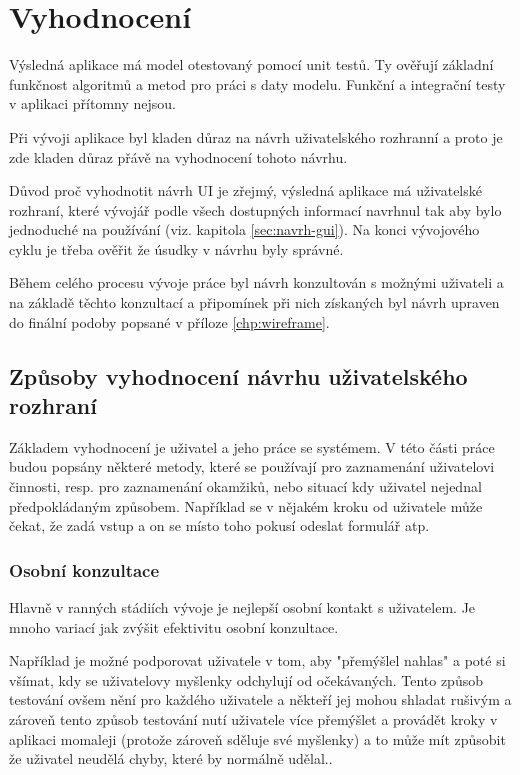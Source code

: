 \chapter{Vyhodnocení}
Výsledná aplikace má model otestovaný pomocí unit testů. Ty ověřují základní funkčnost algoritmů a metod pro práci s daty modelu. Funkční a integrační testy v aplikaci přítomny nejsou.

Při vývoji aplikace byl kladen důraz na návrh uživatelského rozhranní a proto je zde kladen důraz přávě na vyhodnocení tohoto návrhu.

Důvod proč vyhodnotit návrh UI je zřejmý, výsledná aplikace má uživatelské rozhraní, které vývojář podle všech dostupných informací navrhnul tak aby bylo jednoduché na používání (viz. kapitola \ref{sec:navrh-gui}). Na konci vývojového cyklu je třeba ověřit že úsudky v návrhu byly správné.  

Během celého procesu vývoje práce byl návrh konzultován s možnými uživateli a na základě těchto konzultací a připomínek při nich získaných byl návrh upraven do finální podoby popsané v příloze \ref{chp:wireframe}.

\section{Způsoby vyhodnocení návrhu uživatelského rozhraní}
Základem vyhodnocení je uživatel a jeho práce se systémem. V této části práce budou popsány některé metody, které se používají pro zaznamenání uživatelovi činnosti, resp. pro zaznamenání okamžiků, nebo situací kdy uživatel nejednal předpokládaným způsobem. Například se v nějakém kroku od uživatele může čekat, že zadá vstup a on se místo toho pokusí odeslat formulář atp.

\subsection{Osobní konzultace}
Hlavně v ranných stádiích vývoje je nejlepší osobní kontakt s uživatelem\cite{stone2005user}. Je mnoho variací jak zvýšit efektivitu osobní konzultace.

Například je možné podporovat uživatele v tom, aby "přemýšlel nahlas" a poté si všímat, kdy se uživatelovy myšlenky odchylují od očekávaných. Tento způsob testování ovšem nění pro každého uživatele a někteří jej mohou shladat rušivým a zároveň tento způsob testování nutí uživatele více přemýšlet a provádět kroky v aplikaci momaleji (protože zároveň sděluje své myšlenky) a to může mít způsobit že uživatel neudělá chyby, které by normálně udělal.\cite{stone2005user}.

